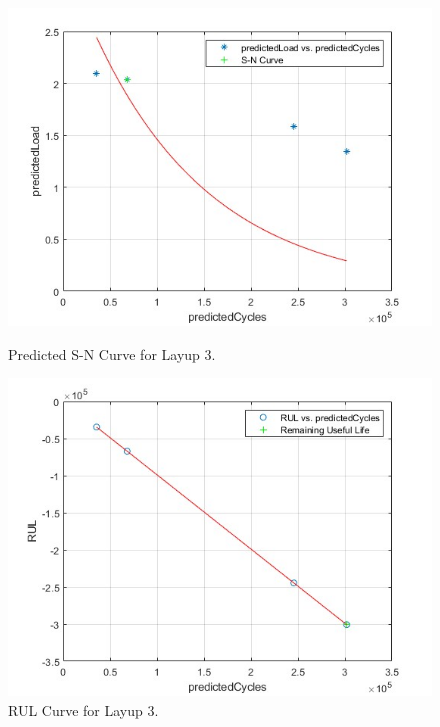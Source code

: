 \begin{figure}[h]
    \centering
    \begin{minipage}{0.45\textwidth}
        \centering
        \includegraphics[width=\linewidth]{s_n_3.jpg}
        \caption{Predicted S-N Curve for Layup 3.}
    \end{minipage}
    \hfill
    \begin{minipage}{0.45\textwidth}
        \centering
        \includegraphics[width=\linewidth]{rul_3.jpg}
        \caption{RUL Curve for Layup 3.}
    \end{minipage}
\end{figure}





